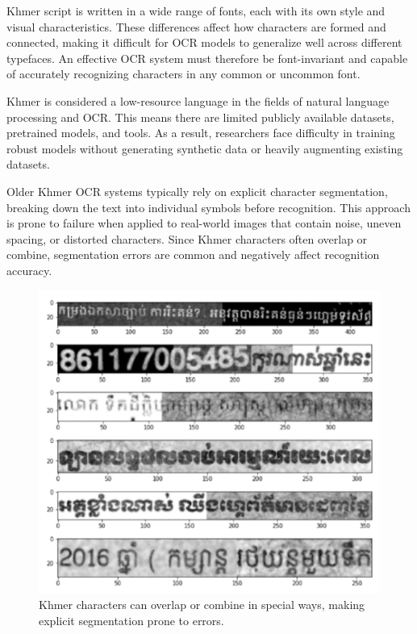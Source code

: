 Khmer script is written in a wide range of fonts, each with its own style and visual 
characteristics. \cite{buoy2021seq2seq} These differences affect how characters are formed and connected, 
making it difficult for OCR models to generalize well across different typefaces. 
An effective OCR system must therefore be font-invariant and capable of accurately 
recognizing characters in any common or uncommon font.

Khmer is considered a low-resource language in the fields of natural language 
processing and OCR. This means there are limited publicly available datasets, 
pretrained models, and tools. As a result, researchers face difficulty in 
training robust models without generating synthetic data or heavily augmenting 
existing datasets.

Older Khmer OCR systems typically rely on explicit character segmentation, 
breaking down the text into individual symbols before recognition. 
This approach is prone to failure when applied to real-world images that 
contain noise, uneven spacing, or distorted characters. \cite{buoy2021seq2seq} Since Khmer characters 
often overlap or combine, segmentation errors are common and negatively affect 
recognition accuracy.

\begin{figure}[ht]
    \centering
    \includegraphics[width=\textwidth]{figures/overlap_segmentation.png}
    \caption{Khmer characters can overlap or combine in special ways, 
    making explicit segmentation prone to errors. \cite{buoy2021seq2seq}}
    \label{fig:overlap-segmentation}
\end{figure}

